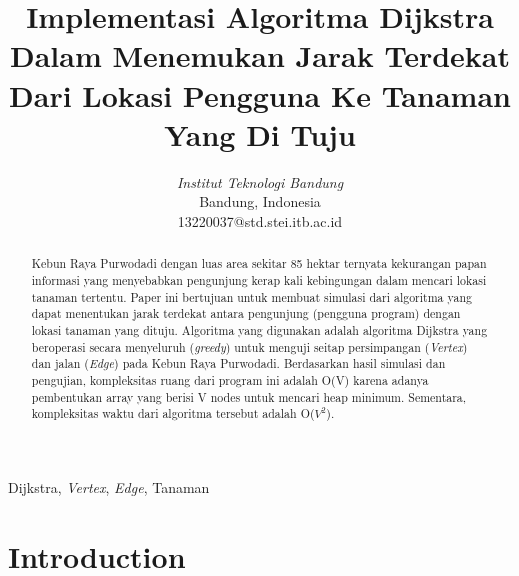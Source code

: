 \documentclass[conference]{IEEEtran}
\title{Implementasi Algoritma Dijkstra Dalam
Menemukan Jarak Terdekat Dari Lokasi Pengguna
Ke Tanaman Yang Di Tuju}
\author{\IEEEauthorblockN{Muhammad Rafli Fadilah Yusmar}
\IEEEauthorblockA{\textit{School of Electrical Engineering and Informatics}}
\textit{\textit{Institut Teknologi Bandung}}\\
Bandung, Indonesia\\
13220037@std.stei.itb.ac.id}
\begin{document}
\maketitle

\begin{abstract}
Kebun Raya Purwodadi dengan luas area sekitar 85
hektar ternyata kekurangan papan informasi yang menyebabkan
pengunjung kerap kali kebingungan dalam mencari lokasi tanaman tertentu. Paper ini bertujuan untuk membuat simulasi
dari algoritma yang dapat menentukan jarak terdekat antara
pengunjung (pengguna program) dengan lokasi tanaman yang
dituju. Algoritma yang digunakan adalah algoritma Dijkstra
yang beroperasi secara menyeluruh (\textit{greedy}) untuk menguji
seitap persimpangan (\textit{Vertex}) dan jalan (\textit{Edge}) pada Kebun
Raya Purwodadi. Berdasarkan hasil simulasi dan pengujian,
kompleksitas ruang dari program ini adalah O(V) karena adanya
pembentukan array yang berisi V nodes untuk mencari heap minimum. Sementara, kompleksitas waktu dari algoritma tersebut
adalah O($V^{2}$).
\end{abstract}

\begin{IEEEkeywords}
Dijkstra, \textit{Vertex}, \textit{Edge}, Tanaman
\end{IEEEkeywords}

\section{Introduction}
\end{document}
